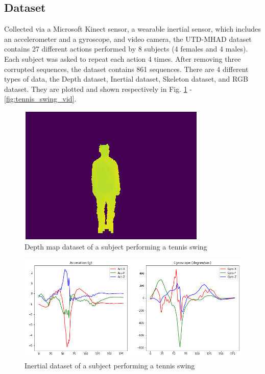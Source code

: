 \documentclass[conference]{IEEEtran}
\begin{document}
\subsection{Dataset}
Collected via a Microsoft Kinect sensor, a wearable inertial sensor, which includes an accelerometer and a gyroscope, and video camera, the UTD-MHAD dataset contains 27 different actions performed by 8 subjects (4 females and 4 males). Each subject was asked to repeat each action 4 times. After removing three corrupted sequences, the dataset contains 861 sequences. There are 4 different types of data, the Depth dataset, Inertial dataset, Skeleton dataset, and RGB dataset. They are plotted and shown respectively in Fig. \ref{fig:tennis_swing_depth} - \ref{fig:tennis_swing_vid}.
\begin{figure}[H]
\begin{center}
\includegraphics[scale=0.3]{depth_tennis_swing.png}
\caption{\label{fig:tennis_swing_depth} Depth map dataset of a subject performing a tennis swing}
\end{center}
\end{figure}
\begin{figure}[H]
\begin{center}
\includegraphics[scale=0.3]{inertial_tennis_swing.png}
\end{center}
\caption{\label{fig:tennis_swing_iner} Inertial dataset of a subject performing a tennis swing}
\end{figure}
\end{document}
